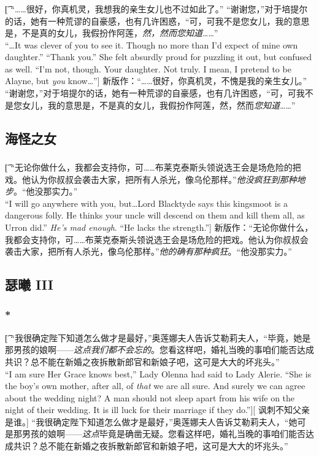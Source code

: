 \documentclass[12pt,a4paper]{article}
\begin{document}
\subsubsection{}\t[
	“……很好，你真机灵，我想我的亲生女儿也不过如此了。” “谢谢您，”对于培提尔的话，她有一种荒谬的自豪感，也有几许困惑，“可，可我不是您女儿，我的意思是，不是真的女儿，我假扮作阿莲，\emph{然，然而您知道}……” \\	
	“\ldots It was clever of you to see it. Though no more than I'd expect of mine own daughter.” “Thank you.” She felt absurdly proud for puzzling it out, but confused as well. “I'm not, though. Your daughter. Not truly. I mean, I pretend to be Alayne, but \emph{you} know\ldots”]
新版作：“……很好，你真机灵，不愧是我的亲生女儿。” “谢谢您，”对于培提尔的话，她有一种荒谬的自豪感，也有几许困惑，“可，可我不是您女儿，我的意思是，不是真的女儿，我假扮作阿莲，然，然而\emph{您知道}……” 	

\subsection{海怪之女}
\subsubsection{}\t[
	 “无论你做什么，我都会支持你，可……布莱克泰斯头领说选王会是场危险的把戏。他认为你叔叔会袭击大家，把所有人杀光，像乌伦那样。”\emph{他没疯狂到那种地步}。“他没那实力。”\\
	 “I will go anywhere with you, but\ldots Lord Blacktyde says this kingsmoot is a dangerous folly. He thinks your uncle will descend on them and kill them all, as Urron did.” \emph{He's mad enough}. “He lacks the strength.”]
	 新版作：“无论你做什么，我都会支持你，可……布莱克泰斯头领说选王会是场危险的把戏。他认为你叔叔会袭击大家，把所有人杀光，像乌伦那样。”\emph{他的确有那种疯狂}。“他没那实力。”
	 
\subsection{瑟曦 III}
\subsubsection{\color{red}*}\t[
	“我很确定陛下知道怎么做才是最好，”奥莲娜夫人告诉艾勒莉夫人，“毕竟，她是那男孩的娘啊——\emph{这点我们都不会忘的}。您看这样吧，婚礼当晚的事咱们能否达成共识？总不能在新婚之夜拆散新郎官和新娘子吧，这可是大大的坏兆头。”\\
	“I am sure Her Grace knows best,” Lady Olenna had said to Lady Alerie. “She is the boy's own mother, after all, of \emph{that} we are all sure. And surely we can agree about the wedding night? A man should not sleep apart from his wife on the night of their wedding. It is ill luck for their marriage if they do.”][
	讽刺不知父亲是谁。]
	“我很确定陛下知道怎么做才是最好，”奥莲娜夫人告诉艾勒莉夫人，“她可是那男孩的娘啊——\emph{这点}毕竟是确凿无疑。您看这样吧，婚礼当晚的事咱们能否达成共识？总不能在新婚之夜拆散新郎官和新娘子吧，这可是大大的坏兆头。”
\end{document}

